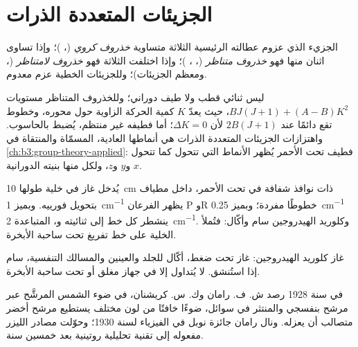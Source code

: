 \section{الجزيئات المتعددة الذرات}

\begin{definition}\label{def:b3:rovibrational-spectroscopy:rotor-types}
الجزيء الذي عزوم عطالته الرئيسية الثلاثة متساوية
\emph{خذروف كروي} (، )؛ وإذا تساوى اثنان منها فهو
\emph{خذروف متناظر} (، ، )؛
وإذا اختلفت الثلاثة فهو \emph{خذروف لامتناظر}
(، ومعظم الجزيئات)؛ وللجزيئات الخطية عزم معدوم.
\end{definition}

ليس  ثنائي قطب ولا طيف دوراني؛ وللخذروف المتناظر
مستويات $BJ(J+1) + (A - B)K^2$، حيث يعدّ $K$ كمية الحركة الزاوية حول محوره،
وخطوط تقع دائمًا عند $2B(J+1)$ لأن $\Delta K = 0$؛ أما 
فطيفه غير منتظم، يُضبط بالحاسوب. واهتزازات الجزيئات المتعددة الذرات
هي أنماطها العادية، المسمّاة والمنتقاة في
\cref{ch:b3:group-theory-applied}: فطيف تحت الأحمر يُظهر الأنماط
التي تتحول كما تتحول $x$ و$y$ و$z$، ولكل منها بنيته الدورانية.

\begin{inthelab}
يُدخل غاز  في خلية طولها \qty{10}{cm} ذات نوافذ شفافة في
تحت الأحمر، داخل مطياف بتحويل فورييه. وبميز \qty{1}{cm^{-1}}
يظهر الفرعان P وR خطوطًا مفردة؛ وبميز \qty{0.25}{cm^{-1}} ينشطر كل خط
إلى ثنائيته  و، المتباعدة \qty{2}{cm^{-1}}. وكلوريد
الهيدروجين سام وأكّال: فتُملأ الخلية على خط تفريغ تحت ساحبة
الأبخرة.
\end{inthelab}

\begin{safety}{}
غاز كلوريد الهيدروجين: غاز تحت ضغط، أكّال للجلد والعينين 
والمسالك التنفسية، سام إذا استُنشق. لا يُتداول إلا في جهاز مغلق أو تحت
ساحبة الأبخرة.
\end{safety}

\begin{history}[رامان، 1928]
في سنة 1928 رصد ش. ف. رامان وك. س. كريشنان، في ضوء الشمس المرشَّح عبر
مرشح بنفسجي والمنتثر في سوائل، ضوءًا خافتًا من لون مختلف
يستطيع مرشح أخضر متصالب أن يعزله. ونال رامان جائزة نوبل في الفيزياء لسنة 1930؛
وحوّلت مصادر الليزر مفعوله إلى تقنية تحليلية
روتينية بعد خمسين سنة.
\end{history}

